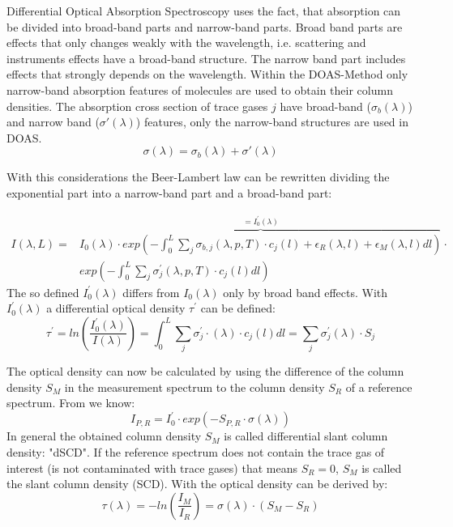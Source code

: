 \documentclass  [
  paper    = a4,
  BCOR     = 10mm,
  twoside,
  fontsize = 12pt,
  fleqn,
  toc      = bibnumbered,
  toc      = listofnumbered,
  numbers  = noendperiod,
  headings = normal,
  listof   = leveldown,
  version  = 3.03
]                                       {scrreprt}
\begin{document}
	Differential Optical Absorption Spectroscopy uses the fact, that absorption can be divided into broad-band parts and narrow-band parts. Broad band parts are effects that only changes weakly with the wavelength,  i.e. scattering and instruments effects have a broad-band structure. 
	The narrow band part includes effects that strongly depends on the wavelength.
	Within the DOAS-Method only narrow-band absorption features of molecules are used to obtain their column densities.
	The absorption cross section of trace gases $j$ have broad-band ($\sigma_b\left(\lambda \right)$) and narrow band ($\sigma{'}\left(\lambda \right)$) features, only the narrow-band structures are used in DOAS.
	\begin{equation}
	\sigma\left(\lambda \right) = \sigma_b\left(\lambda \right) + \sigma{'}\left(\lambda \right)
	\end{equation}

	With this considerations the Beer-Lambert law  can be rewritten
	dividing the exponential part into a narrow-band part and a broad-band part:

	\begin{align}
	I\left(\lambda,L\right) = &\overbrace{I_{0}\left(\lambda\right)\cdot exp\left(-\int^{L}_{0}\sum_{j}\sigma_{b,j}\left(\lambda,p,T\right)\cdot c_{j}\left(l\right)+\epsilon_R\left(\lambda,l\right)+\epsilon_{M}\left(\lambda,l\right)dl\right)}^{=I^{'}_0\left(\lambda\right)} \cdot \nonumber \\
	&exp\left(-\int^{L}_{0}\sum_{j}\sigma_{j}^{'}\left(\lambda,p,T\right)\cdot c_{j}\left(l\right)dl\right)
	\label{eq:bb}
	\end{align}	
	The so defined $I^{'}_0\left(\lambda\right)$ differs from $I_0\left(\lambda\right)$ only by broad band effects. With $I^{'}_0\left(\lambda\right)$ a differential optical density $\tau^{'}$ can be defined:
	\begin{equation}
	\tau^{'} = ln\left(\frac{I^{'}_0\left(\lambda\right)}{I\left(\lambda\right)}\right) = \int_{0}^{L} \sum_{j} \sigma^{'}_{j} \cdot \left(\lambda\right) \cdot c_{j}\left(l\right)dl = \sum_{j}\sigma^{'}_{j}\left(\lambda\right)\cdot S_{j}
	\label{eq:taustrich}
	\end{equation}
	
	The optical density can now be calculated by using the difference of the column density $S_{M}$ in the measurement spectrum to the column density $S_{R}$ of a reference spectrum. From  we know:	
	\begin{equation}
	I_{P,R} = I^{'}_{0}\cdot exp\left(-S_{P,R}\cdot\sigma\left(\lambda\right)\right)
	\label{eq:smr}
	\end{equation}
	In general the obtained column density $S_{M}$ is called differential slant column density: "dSCD". If the reference spectrum does not contain the trace gas of interest (is not contaminated with trace gases) that means $S_{R} = 0$, $S_{M}$ is called the slant column	density (SCD). 
	With  the optical density can be derived by:
	\begin{equation}
	\tau\left(\lambda\right) = -ln\left(\frac{I_{M}}{I_{R}}\right) = \sigma\left(\lambda\right)\cdot\left(S_{M}-S_{R}\right)
	\end{equation}
	
\end{document}
